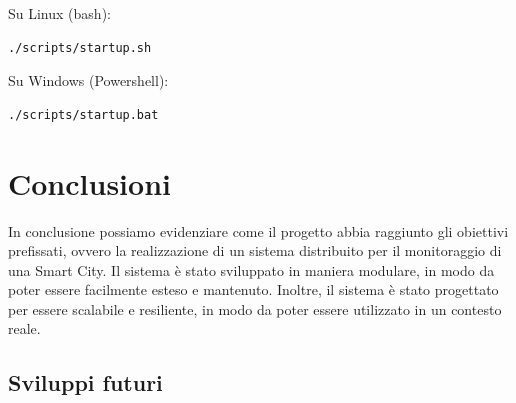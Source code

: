 \documentclass{scrartcl}
\begin{document}
Su Linux (bash):

\begin{lstlisting}[language=bash]
    ./scripts/startup.sh
\end{lstlisting}

Su Windows (Powershell):

\begin{lstlisting}[language=bash]
    ./scripts/startup.bat
\end{lstlisting}

\section{Conclusioni}

In conclusione possiamo evidenziare come il progetto abbia raggiunto gli obiettivi prefissati, ovvero la realizzazione di un sistema distribuito per il monitoraggio di una Smart City. Il sistema è stato sviluppato in maniera modulare, in modo da poter essere facilmente esteso e mantenuto. Inoltre, il sistema è stato progettato per essere scalabile e resiliente, in modo da poter essere utilizzato in un contesto reale.

\subsection{Sviluppi futuri}
\end{document}
